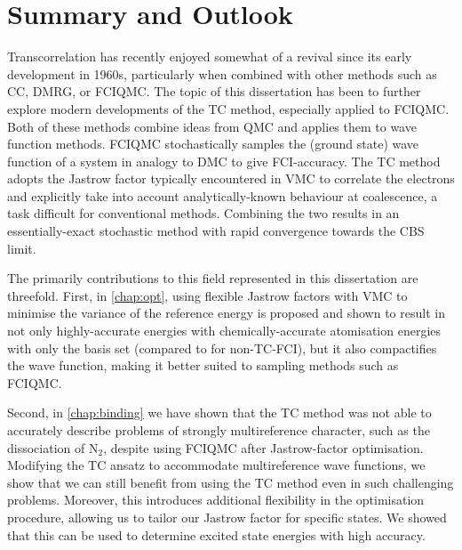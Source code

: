 \chapter{Summary and Outlook}
  \label{chap:sumandout}

Transcorrelation has recently enjoyed somewhat of a revival since its early development in 1960s, particularly when combined with other methods such as \gls{CC}, \gls{DMRG}, or \gls{FCIQMC}. The topic of this dissertation has been to further explore modern developments of the \gls{TC} method, especially applied to FCIQMC. Both of these methods combine ideas from \gls{QMC} and applies them to wave function methods. FCIQMC stochastically samples the (ground state) wave function of a system in analogy to \gls{DMC} to give \gls{FCI}-accuracy. The TC method adopts the Jastrow factor typically encountered in \gls{VMC} to correlate the electrons and explicitly take into account analytically-known behaviour at coalescence, a task difficult for conventional methods. Combining the two results in an essentially-exact stochastic method with rapid convergence towards the \gls{CBS} limit.

The primarily contributions to this field represented in this dissertation are threefold. First, in \autoref{chap:opt}, using flexible Jastrow factors with VMC to minimise the variance of the reference energy is proposed and shown to result in not only highly-accurate energies with chemically-accurate atomisation energies with only the \vtz basis set (compared to  for non-TC-FCI), but it also compactifies the wave function, making it better suited to sampling methods such as FCIQMC.

Second, in \autoref{chap:binding} we have shown that the TC method was not able to accurately describe problems of strongly multireference character, such as the dissociation of N$_2$, despite using FCIQMC after Jastrow-factor optimisation. Modifying the TC ansatz to accommodate multireference wave functions, we show that we can still benefit from using the TC method even in such challenging problems. Moreover, this introduces additional flexibility in the optimisation procedure, allowing us to tailor our Jastrow factor for specific states. We showed that this can be used to determine excited state energies with high accuracy.

